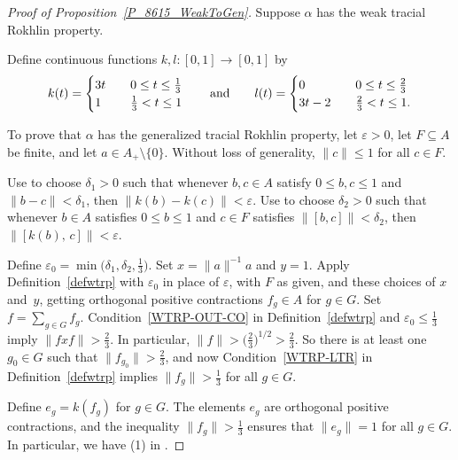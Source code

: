 \documentclass[11pt]{amsart}
\theoremstyle{plain}
\theoremstyle{definition}
\theoremstyle{remark}
\numberwithin{equation}{section}
\newcommand{\dt}{\delta}
\newcommand{\ep}{\varepsilon}
\newcommand{\andeqn}{\qquad {\mbox{and}} \qquad}
\begin{document}
\begin{proof}[Proof of Proposition~\ref{P_8615_WeakToGen}]
Suppose $\alpha$ has the weak tracial Rokhlin property.

Define continuous functions
$k, l \colon [0, 1] \to [0, 1]$
by
\[
k ( t )
 = \begin{cases}
   3 t & \hspace*{1em} 0 \leq t \leq \frac{1}{3}
       \\
   1   & \hspace*{1em} \frac{1}{3} < t \leq 1
\end{cases}
\andeqn
l (t)
 = \begin{cases}
   0       & \hspace*{1em} 0 \leq t \leq \frac{2}{3}
       \\
   3 t - 2 & \hspace*{1em} \frac{2}{3} < t \leq 1.
\end{cases}
\]

To prove that $\alpha$ has the generalized tracial Rokhlin property,
let $\varepsilon > 0$,
let $F \subseteq A$ be finite,
and let $a \in A_{+} \setminus \{ 0 \}$.
Without loss of generality,
$\| c \| \leq 1$ for all $c \in F$.

Use \cite[Lemma 2.5.11(2)]{LnBook}
to choose $\dt_1 > 0$
such that whenever $b, c \in A$
satisfy $0 \leq b, c \leq 1$
and $\| b - c \| < \dt_1$,
then $\| k (b) - k (c) \| < \ep$.
Use \cite[Lemma 2.5]{AP16}
to choose $\dt_2 > 0$
such that whenever $b \in A$
satisfies $0 \leq b \leq 1$
and $c \in F$
satisfies $\| [b, c] \| < \dt_2$,
then $\| [k (b), \, c] \| < \ep$.

Define
$\varepsilon_0
 = \min \big( \dt_1, \dt_2, \frac{1}{3} \big)$.
Set $x = \| a \|^{-1} a$ and $y = 1$.
Apply Definition~\ref{defwtrp}
with $\varepsilon_0$ in place of $\varepsilon$, with $F$ as given,
and these choices of $x$ and~$y$,
getting orthogonal positive contractions
$f_g \in A$ for $g \in G$.
Set $f = \sum_{g \in G} f_{g}$.
Condition~\eqref{WTRP-OUT-CO} in Definition~\ref{defwtrp}
and $\varepsilon_0 \leq \frac{1}{3}$ imply $\| f x f \| > \frac{2}{3}$.
In particular,
$\| f \| > \big( \frac{2}{3} \big)^{1/2} > \frac{2}{3}$.
So there is at least one $g_0 \in G$
such that $\| f_{g_0} \| > \frac{2}{3}$,
and now Condition~\eqref{WTRP-LTR} in Definition~\ref{defwtrp}
implies $\| f_{g} \| > \frac{1}{3}$ for all $g \in G$.


Define $e_g = k (f_g)$ for $g \in G$.
The elements $e_g$ are orthogonal positive contractions,
and the inequality $\| f_{g} \| > \frac{1}{3}$
ensures that $\| e_g \| = 1$ for all $g \in G$.
In particular, we have (1) in \cite[Definition 5.2]{HO13}.


\end{proof}
\end{document}
